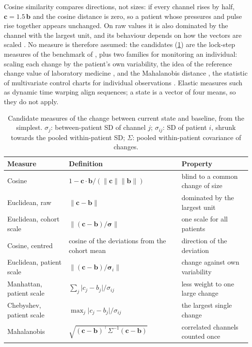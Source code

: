 Cosine similarity compares directions, not sizes: if every channel rises by half, $\mathbf{c} = 1.5\,\mathbf{b}$ and the cosine distance is zero, so a patient whose pressures and pulse rise together appears unchanged. On raw values it is also dominated by the channel with the largest unit, and its behaviour depends on how the vectors are scaled \parencite{steck2024}. No measure is therefore assumed: the candidates (\cref{tab:state-measures}) are the lock-step measures of the benchmark of \textcite{wang2013timeseries}, plus two families for monitoring an individual: scaling each change by the patient's own variability, the idea of the reference change value of laboratory medicine \parencite{fraser1989}, and the Mahalanobis distance \parencite{mahalanobis1936}, the statistic of multivariate control charts for individual observations \parencite{tracy1992}. Elastic measures such as dynamic time warping align sequences; a state is a vector of four means, so they do not apply.

\begin{table}[htbp]
\centering\footnotesize
\caption{Candidate measures of the change between current state and baseline, from the simplest. $\sigma_j$: between-patient SD of channel $j$; $\sigma_{ij}$: SD of patient $i$, shrunk towards the pooled within-patient SD; $\Sigma$: pooled within-patient covariance of changes.}\label{tab:state-measures}
\begin{tabularx}{\textwidth}{@{}>{\raggedright\arraybackslash}p{3.2cm} >{\raggedright\arraybackslash}p{4.6cm} X@{}}
\toprule
\textbf{Measure} & \textbf{Definition} & \textbf{Property} \\
\midrule
Cosine & $1 - \mathbf{c}\cdot\mathbf{b}/(\lVert\mathbf{c}\rVert\lVert\mathbf{b}\rVert)$ & blind to a common change of size \\
Euclidean, raw & $\lVert\mathbf{c} - \mathbf{b}\rVert$ & dominated by the largest unit \\
Euclidean, cohort scale & $\lVert(\mathbf{c} - \mathbf{b})/\boldsymbol{\sigma}\rVert$ & one scale for all patients \\
Cosine, centred & cosine of the deviations from the cohort mean & direction of the deviation \\
Euclidean, patient scale & $\lVert(\mathbf{c} - \mathbf{b})/\boldsymbol{\sigma}_i\rVert$ & change against own variability \\
Manhattan, patient scale & $\sum_j \lvert c_j - b_j\rvert/\sigma_{ij}$ & less weight to one large change \\
Chebyshev, patient scale & $\max_j \lvert c_j - b_j\rvert/\sigma_{ij}$ & the largest single change \\
Mahalanobis & $\sqrt{(\mathbf{c} - \mathbf{b})^{\top}\Sigma^{-1}(\mathbf{c} - \mathbf{b})}$ & correlated channels counted once \\
\bottomrule
\end{tabularx}
\end{table}

